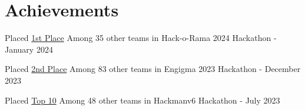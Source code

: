 \documentclass[a4paper,11pt]{article}
\makeatletter
\newcommand{\resumeItem}[1]{
  \item\small{
    {#1 \vspace{-2pt}}
  }
}
\newcommand{\resumeSubheading}[4]{
  \vspace{-2pt}\item
    \begin{tabular*}{1.0\textwidth}[t]{l@{\extracolsep{\fill}}r}
      \textbf{#1} & \textbf{\small #2} \\
      \textit{\small#3} & \textit{\small #4} \\
    \end{tabular*}\vspace{-7pt}
}
\newcommand{\resumeSubItem}[1]{\resumeItem{#1}\vspace{-4pt}}
\newcommand{\resumeSubHeadingListStart}{\begin{itemize}[leftmargin=0.0in, label={}]}
\newcommand{\resumeSubHeadingListEnd}{\end{itemize}}
\makeatother
\begin{document}
\section{Achievements}
\begin{description}[font=$\bullet$]
\item {Placed \href{https://www.linkedin.com/posts/akash-singh-a57081253_hackorama-ai-ml-activity-7155577685312745472-r8Sm?utm_source=share&utm_medium=member_desktop}{1st Place} Among 35 other teams in Hack-o-Rama 2024 Hackathon - January 2024}
\vspace{-5pt}
\item {Placed \href{https://www.linkedin.com/posts/akash-singh-a57081253_enigma2023-hackathonwin-leadership-activity-7144367368339636224-ZRHx?utm_source=share&utm_medium=member_desktop}{2nd Place} Among 83 other teams in Engigma 2023 Hackathon - December 2023}
\vspace{-5pt}
\item {Placed \href{https://www.linkedin.com/posts/akash-singh-a57081253_machinelearning-activity-7079134591952846848-fUs9?utm_source=share&utm_medium=member_desktop}{Top 10} Among 48 other teams in Hackmanv6 Hackathon - July 2023}
\vspace{-5pt}
\vspace{-5pt}

\end{description}


\vspace{-5pt}

    

\end{document}
